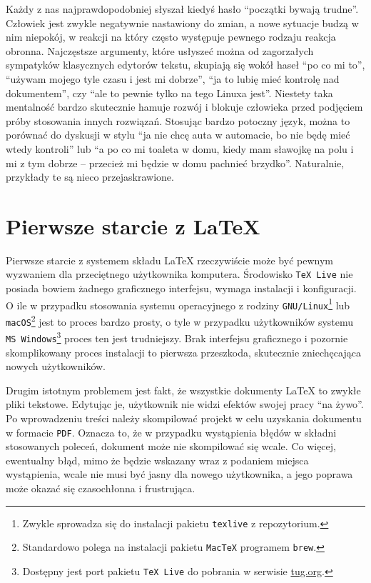 Każdy z nas najprawdopodobniej słyszał kiedyś hasło \enquote{początki bywają trudne}. Człowiek jest zwykle negatywnie nastawiony do zmian, a nowe sytuacje budzą w nim niepokój, w reakcji na który często występuje pewnego rodzaju reakcja obronna. Najczęstsze argumenty, które usłyszeć można od zagorzałych sympatyków klasycznych edytorów tekstu, skupiają się wokół haseł \enquote{po co mi to}, \enquote{używam mojego tyle czasu i jest mi dobrze}, \enquote{ja to lubię mieć kontrolę nad dokumentem}, czy \enquote{ale to pewnie tylko na tego Linuxa jest}. Niestety taka mentalność bardzo skutecznie hamuje rozwój i blokuje człowieka przed podjęciem próby stosowania innych rozwiązań. Stosując bardzo potoczny język, można to porównać do dyskusji w stylu \enquote{ja nie chcę auta w automacie, bo nie będę mieć wtedy kontroli} lub \enquote{a po co mi toaleta w domu, kiedy mam sławojkę na polu i mi z tym dobrze -- przecież mi będzie w domu pachnieć brzydko}. Naturalnie, przykłady te są nieco przejaskrawione.

\section{Pierwsze starcie z \LaTeX}

Pierwsze starcie z systemem składu \LaTeX{} rzeczywiście może być pewnym wyzwaniem dla przeciętnego użytkownika komputera. Środowisko \texttt{TeX Live} nie posiada bowiem żadnego graficznego interfejsu, wymaga instalacji i konfiguracji. O ile w przypadku stosowania systemu operacyjnego z rodziny \texttt{GNU/Linux}\footnote{Zwykle sprowadza się do instalacji pakietu \texttt{texlive} z repozytorium.} lub \texttt{macOS}\footnote{Standardowo polega na instalacji pakietu \texttt{MacTeX} programem \texttt{brew}.} jest to proces bardzo prosty, o tyle w przypadku użytkowników systemu \texttt{MS Windows}\footnote{Dostępny jest port pakietu \texttt{TeX Live} do pobrania w serwisie \href{https://tug.org/texlive/windows.html}{tug.org}.} proces ten jest trudniejszy. Brak interfejsu graficznego i pozornie skomplikowany proces instalacji to pierwsza przeszkoda, skutecznie zniechęcająca nowych użytkowników.

Drugim istotnym problemem jest fakt, że wszystkie dokumenty \LaTeX{} to zwykłe pliki tekstowe. Edytując je, użytkownik nie widzi efektów swojej pracy \enquote{na żywo}. Po wprowadzeniu treści należy skompilować projekt w celu uzyskania dokumentu w formacie \texttt{PDF}. Oznacza to, że w przypadku wystąpienia błędów w składni stosowanych poleceń, dokument może nie skompilować się wcale. Co więcej, ewentualny błąd, mimo że będzie wskazany wraz z podaniem miejsca wystąpienia, wcale nie musi być jasny dla nowego użytkownika, a jego poprawa może okazać się czasochłonna i frustrująca.

